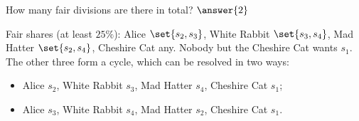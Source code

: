 \documentclass[12pt]{ximera}
\begin{document}
\begin{problem}
\begin{prompt}
\smallskip
How many fair divisions are there in total? $\answer{2}$
\begin{feedback}
Fair shares (at least $25\%$): Alice $\set{s_2,s_3}$, White Rabbit $\set{s_3,s_4}$,
Mad Hatter $\set{s_2,s_4}$, Cheshire Cat any. Nobody but the Cheshire Cat wants $s_1$.
The other three form a cycle, which can be resolved in two ways:
\begin{itemize}
\item Alice $s_2$, White Rabbit $s_3$, Mad Hatter $s_4$, Cheshire Cat $s_1$;
\item Alice $s_3$, White Rabbit $s_4$, Mad Hatter $s_2$, Cheshire Cat $s_1$.
\end{itemize}
\end{feedback}
\end{prompt}
\end{problem}
\end{document}

